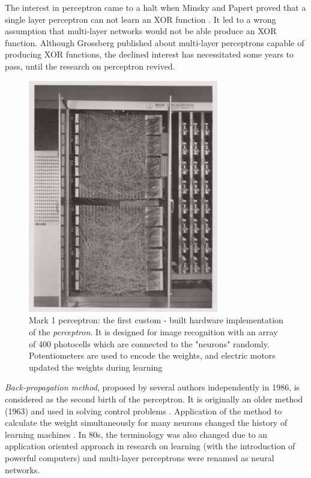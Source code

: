 The interest in perceptron came to a halt when Minsky and Papert proved that a single layer perceptron can not learn an XOR function \cite{minsky1969perceptron}.
It led to a wrong assumption that multi-layer networks would not be able produce an XOR function. Although Grossberg published about multi-layer perceptrons capable of producing XOR functions, the declined interest has necessitated some years to pass, until the research on perceptron revived.


\begin{figure}
\begin{center}
\includegraphics[width=8.3cm]{figures/Mark_I_perceptron}
\caption{Mark 1 perceptron: the first custom - built hardware implementation of the \emph{perceptron}. It is designed for image recognition with an array of 400 photocells which are connected to the "neurons" randomly.  Potentiometers are used to encode the weights, and electric motors updated the weights during learning \cite{bishop2006pattern}} 
\label{fig:Mark_I_perceptron}
\end{center}
\end{figure}

\emph{Back-propagation method}, proposed by several authors \cite{le1986learning,rumelhart1986learning} independently in 1986, is considered as the second birth of the perceptron. It is originally an older method (1963) \cite{bryson1963optimal} and used in solving control problems \cite{vapnik2013nature}. Application of the method to calculate the weight simultaneously for many neurons changed the history of learning machines \cite{vapnik2013nature}. In 80s, the terminology was also changed due to an application oriented approach in research on learning (with the introduction of powerful computers) \cite{vapnik2013nature} and multi-layer perceptrons were renamed as neural networks.

